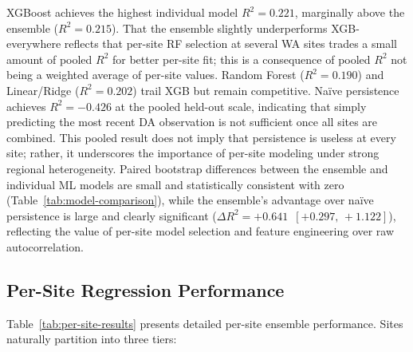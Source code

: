 \documentclass[toxins,article,submit,moreauthors]{Definitions/mdpi}
\begin{document}
XGBoost achieves the highest individual model $R^2 = 0.221$, marginally above the ensemble ($R^2 = 0.215$). That the ensemble slightly underperforms XGB-everywhere reflects that per-site RF selection at several WA sites trades a small amount of pooled $R^2$ for better per-site fit; this is a consequence of pooled $R^2$ not being a weighted average of per-site values. Random Forest ($R^2 = 0.190$) and Linear/Ridge ($R^2 = 0.202$) trail XGB but remain competitive. Na\"ive persistence achieves $R^2 = -0.426$ at the pooled held-out scale, indicating that simply predicting the most recent DA observation is not sufficient once all sites are combined. This pooled result does not imply that persistence is useless at every site; rather, it underscores the importance of per-site modeling under strong regional heterogeneity. Paired bootstrap differences between the ensemble and individual ML models are small and statistically consistent with zero (Table~\ref{tab:model-comparison}), while the ensemble's advantage over na\"ive persistence is large and clearly significant ($\Delta R^2 = +0.641$\, $[+0.297,\, +1.122]$), reflecting the value of per-site model selection and feature engineering over raw autocorrelation.

\subsection{Per-Site Regression Performance}
\label{sec:results-per-site}

Table~\ref{tab:per-site-results} presents detailed per-site ensemble performance. Sites naturally partition into three tiers:
\end{document}
